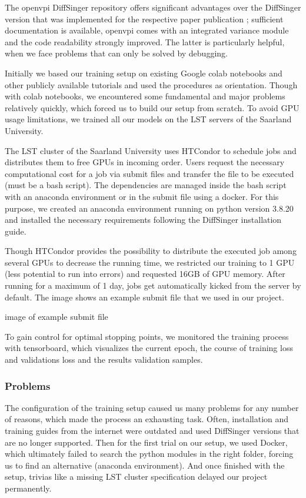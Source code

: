 \documentclass[a4paper]{article}
\begin{document}
	The openvpi DiffSinger repository \cite{openvpi-diffsinger} offers significant advantages over the DiffSinger version that was implemented for the respective paper publication \cite{moon-diffsinger}; sufficient documentation is available, openvpi comes with an integrated variance module and the code readability strongly improved. The latter is particularly helpful, when we face problems that can only be solved by debugging.
	
	Initially we based our training setup on existing Google colab notebooks and other publicly available tutorials and used the procedures as orientation. Though  with colab notebooks, we encountered some fundamental and major problems relatively quickly, which forced us to build our setup from scratch. To avoid GPU usage limitations, we trained all our models on the LST servers of the Saarland University. \cite{lst-wiki}
	
	The LST cluster of the Saarland University uses HTCondor to schedule jobs and distributes them to free GPUs in incoming order. Users request the necessary computational cost for a job via submit files and transfer the file to be executed (must be a bash script). The dependencies are managed inside the bash script with an anaconda environment or in the submit file using a docker. For this purpose, we created an anaconda environment running on python version 3.8.20 and installed the necessary requirements following the DiffSinger installation guide. \cite{openvpi-diffsinger}
	
	Though HTCondor provides the possibility to distribute the executed job among several GPUs to decrease the running time, we restricted our training to 1 GPU (less potential to run into errors) and requested 16GB of GPU memory. After running for a maximum of 1 day, jobs get automatically kicked from the server by default. The image shows an example submit file that we used in our project.
	
	\color{red}image of example submit file\color{black}
	
	To gain control for optimal stopping points, we monitored the training process with tensorboard, which visualizes the current epoch, the course of training loss and validations loss and the results validation samples.
	
	\subsubsection{Problems}
	
	The configuration of the training setup caused us many problems for any number of reasons, which made the process an exhausting task. Often, installation and training guides from the internet were outdated and used DiffSinger versions that are no longer supported. Then for the first trial on our setup, we used Docker, which ultimately failed to search the python modules in the right folder, forcing us to find an alternative (anaconda environment). And once finished with the setup, trivias like a missing LST cluster specification delayed our project permanently. 
	
\end{document}

